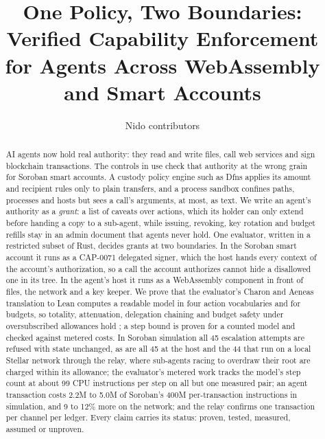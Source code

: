 \expandafter\documentclass\expandafter[\PaperClassOptions]{acmart}
\begin{document}
\title{One Policy, Two Boundaries: Verified Capability Enforcement for Agents Across WebAssembly and Smart Accounts}

\author{Nido contributors}

\begin{abstract}
AI agents now hold real authority: they read and write files, call web
services and sign blockchain transactions. The controls in use check that
authority at the wrong grain for Soroban smart accounts. A custody policy
engine such as Dfns applies its amount and recipient rules only to plain
transfers, and a process sandbox confines paths, processes and hosts but sees
a call's arguments, at most, as text. We write an agent's authority as a
\emph{grant}: a list of caveats over actions, which its holder can only
extend before handing a copy to a sub-agent, while issuing, revoking, key
rotation and budget refills stay in an admin document that agents never hold.
One evaluator, written in a restricted subset of Rust, decides grants at two
boundaries. In the Soroban smart account it runs as a CAP-0071 delegated
signer, which the host hands every context of the account's authorization, so
a call the account authorizes cannot hide a disallowed one in its tree. In the
agent's host it runs as a WebAssembly component in front of files, the network
and a key keeper. We prove that the evaluator's Charon and Aeneas translation
to Lean computes a readable model in four action vocabularies and for budgets,
so totality, attenuation, delegation chaining and budget safety under
oversubscribed allowances hold \translationtrust; a step bound is proven for a
counted model and checked against metered costs. In Soroban simulation all 45
escalation attempts are refused with state unchanged, as are all 45 at the
host and the 44 that run on a local Stellar network through the relay, where
sub-agents racing to overdraw their root are charged within its allowance;
the evaluator's metered work tracks the model's step count at about 99 CPU
instructions per step on all but one measured pair; an agent transaction costs 2.2M to 5.0M of Soroban's
400M per-transaction instructions in simulation, and 9 to 12\% more on the
network; and the relay confirms one transaction per channel per ledger. Every
claim carries its status:
proven, tested, measured, assumed or unproven.
\end{abstract}

\end{document}
